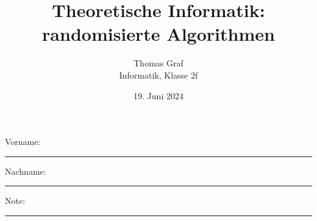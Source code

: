 \newtoggle{withbonus}  %

\newcommand{\mycourse}{Informatik}
\newcommand{\myclass}{Klasse 2f}
\newcommand{\mydate}{19. Juni 2024}

\title{\textbf{Theoretische Informatik: randomisierte Algorithmen}}
\author{Thomas Graf\\
\mycourse, \myclass}
\date{\mydate}
\maketitle
\thispagestyle{headandfoot}		

\begin{center}
\end{center}
\vspace{10mm}

\begin{center}
	Vorname: \rule{45mm}{0.8pt}\qquad Nachname: \rule{45mm}{0.8pt}
\end{center}
\vspace{20mm}

\begin{center}
	\iftoggle{withbonus} {
		\combinedgradetable[h][questions]
	} {
		\gradetable[h][questions]
	}
\end{center}
\vspace{15mm}
\begin{center}
	Note: 
	\vspace{10mm}
	
	\rule{8mm}{1.2pt}
\end{center}
\clearpage



